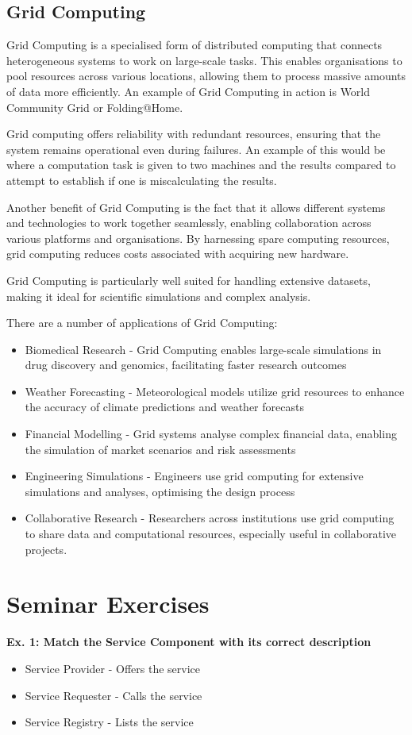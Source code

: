 \subsection{Grid Computing}
Grid Computing is a specialised form of distributed computing that connects heterogeneous systems to work on large-scale tasks. This enables organisations to pool resources across various locations, allowing them to process massive amounts of data more efficiently. An example of Grid Computing in action is World Community Grid or Folding@Home. 

Grid computing offers reliability with redundant resources, ensuring that the system remains operational even during failures. An example of this would be where a computation task is given to two machines and the results compared to attempt to establish if one is miscalculating the results. 

Another benefit of Grid Computing is the fact that it allows different systems and technologies to work together seamlessly, enabling collaboration across various platforms and organisations. By harnessing spare computing resources, grid computing reduces costs associated with acquiring new hardware. 

Grid Computing is particularly well suited for handling extensive datasets, making it ideal for scientific simulations and complex analysis. 

There are a number of applications of Grid Computing:
\begin{itemize}
    \item Biomedical Research - Grid Computing enables large-scale simulations in drug discovery and genomics, facilitating faster research outcomes
    \item Weather Forecasting - Meteorological models utilize grid resources to enhance the accuracy of climate predictions and weather forecasts
    \item Financial Modelling - Grid systems analyse complex financial data, enabling the simulation of market scenarios and risk assessments
    \item Engineering Simulations - Engineers use grid computing for extensive simulations and analyses, optimising the design process
    \item Collaborative Research - Researchers across institutions use grid computing to share data and computational resources, especially useful in collaborative projects. 
\end{itemize}

\section{Seminar Exercises}
\textbf{Ex. 1: Match the Service Component with its correct description}
\begin{itemize}
    \item Service Provider - Offers the service
    \item Service Requester - Calls the service 
    \item Service Registry - Lists the service
\end{itemize}


